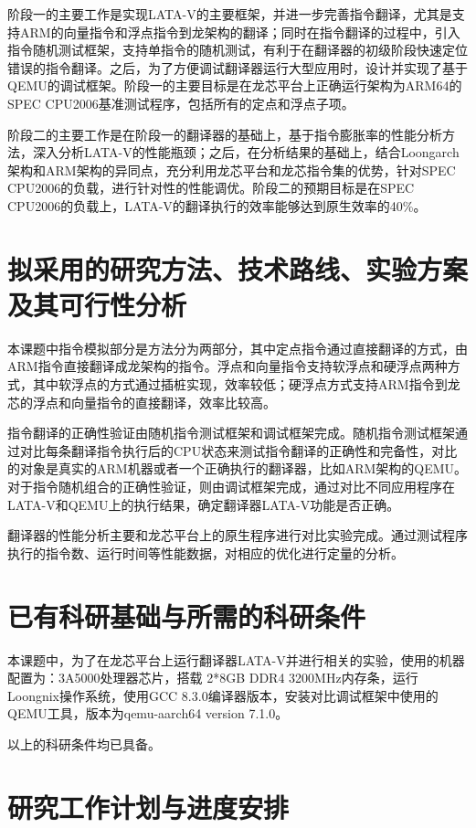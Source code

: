 阶段一的主要工作是实现LATA-V的主要框架，并进一步完善指令翻译，尤其是支持ARM的向量指令和浮点指令到龙架构的翻译；同时在指令翻译的过程中，引入指令随机测试框架，支持单指令的随机测试，有利于在翻译器的初级阶段快速定位错误的指令翻译。之后，为了方便调试翻译器运行大型应用时，设计并实现了基于QEMU的调试框架。阶段一的主要目标是在龙芯平台上正确运行架构为ARM64的SPEC CPU2006基准测试程序，包括所有的定点和浮点子项。

阶段二的主要工作是在阶段一的翻译器的基础上，基于指令膨胀率的性能分析方法，深入分析LATA-V的性能瓶颈；之后，在分析结果的基础上，结合Loongarch架构和ARM架构的异同点，充分利用龙芯平台和龙芯指令集的优势，针对SPEC CPU2006的负载，进行针对性的性能调优。阶段二的预期目标是在SPEC CPU2006的负载上，LATA-V的翻译执行的效率能够达到原生效率的40{\%}。
\section{拟采用的研究方法、技术路线、实验方案及其可行性分析}
本课题中指令模拟部分是方法分为两部分，其中定点指令通过直接翻译的方式，由ARM指令直接翻译成龙架构的指令。浮点和向量指令支持软浮点和硬浮点两种方式，其中软浮点的方式通过插桩实现，效率较低；硬浮点方式支持ARM指令到龙芯的浮点和向量指令的直接翻译，效率比较高。

指令翻译的正确性验证由随机指令测试框架和调试框架完成。随机指令测试框架通过对比每条翻译指令执行后的CPU状态来测试指令翻译的正确性和完备性，对比的对象是真实的ARM机器或者一个正确执行的翻译器，比如ARM架构的QEMU。对于指令随机组合的正确性验证，则由调试框架完成，通过对比不同应用程序在LATA-V和QEMU上的执行结果，确定翻译器LATA-V功能是否正确。

翻译器的性能分析主要和龙芯平台上的原生程序进行对比实验完成。通过测试程序执行的指令数、运行时间等性能数据，对相应的优化进行定量的分析。
\section{已有科研基础与所需的科研条件}

本课题中，为了在龙芯平台上运行翻译器LATA-V并进行相关的实验，使用的机器配置为：3A5000处理器芯片，搭载 2*8GB DDR4 3200MHz内存条，运行Loongnix操作系统，使用GCC 8.3.0编译器版本，安装对比调试框架中使用的QEMU工具，版本为qemu-aarch64 version 7.1.0。

以上的科研条件均已具备。

\section{研究工作计划与进度安排}

